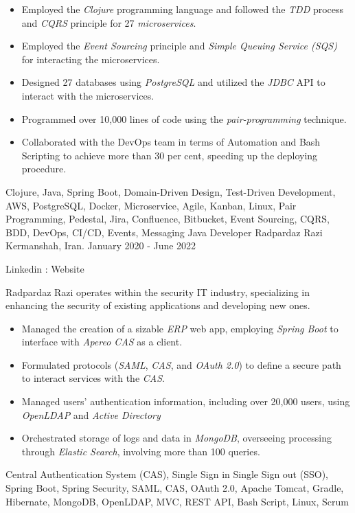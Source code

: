 \begin{experiences}
{\begin{itemize}
   \item Employed the \emph{Clojure} programming language and followed the \emph{TDD} process and \textit{CQRS} principle for 27 \emph{microservices}.
   \item Employed the \textit{Event Sourcing} principle and \textit{Simple Queuing Service (SQS)} for interacting the microservices.
   \item Designed 27 databases using \emph{PostgreSQL} and utilized the \emph{JDBC} API to interact with the microservices.
   \item Programmed over 10,000 lines of code using the \emph{pair-programming} technique.
   \item Collaborated with the DevOps team in terms of Automation and Bash Scripting to achieve more than 30 per cent, speeding up the deploying procedure.
   \end{itemize}}{Clojure, Java, Spring Boot, Domain-Driven Design, Test-Driven Development, AWS, PostgreSQL, Docker, Microservice, Agile, Kanban, Linux, Pair Programming, Pedestal, Jira, Confluence, Bitbucket, Event Sourcing, CQRS, BDD, DevOps, CI/CD, Events, Messaging}
  \emptySeparator 
\experience
{}
{Java Developer}
{Radpardaz Razi}
{Kermanshah, Iran. \hspace{170 pt} January 2020 - June 2022}
{}
{
Linkedin : 
Website 
\par{Radpardaz Razi operates within the security IT industry, specializing in enhancing the security of existing applications and developing new ones.}
\begin{itemize}
\item Managed the creation of a sizable \emph{ERP} web app, employing \emph{Spring Boot} to interface with \emph{Apereo CAS} as a client.
\item Formulated protocols (\emph{SAML}, \emph{CAS}, and \emph{OAuth 2.0}) to define a secure path to interact services with the \textit{CAS}.
\item Managed users' authentication information, including over 20,000 users, using \emph{OpenLDAP} and \emph{Active Directory}
\item Orchestrated storage of logs and data in \emph{MongoDB}, overseeing processing through \emph{Elastic Search}, involving more than 100 queries.
\end{itemize}
}{Central Authentication System (CAS), Single Sign in Single Sign out (SSO), Spring Boot, Spring Security, SAML, CAS, OAuth 2.0, Apache Tomcat, Gradle, Hibernate, MongoDB, OpenLDAP, MVC, REST API, Bash Script, Linux, Scrum}

\end{experiences}

